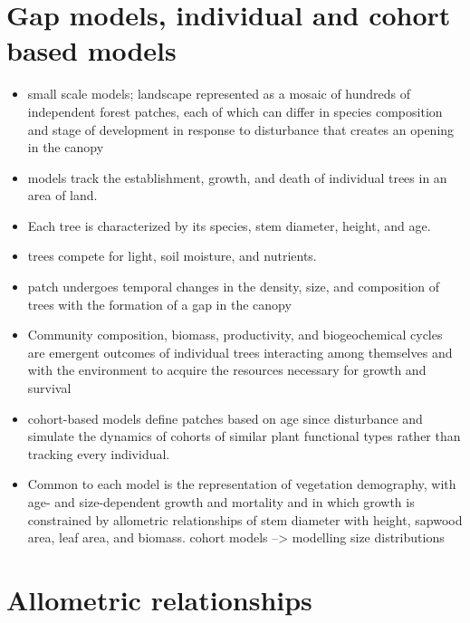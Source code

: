 \documentclass[oneside]{book}
\begin{document}
\section{Gap models, individual and cohort based
models}\label{gap-models-individual-and-cohort-based-models}

\begin{itemize}
\item
  small scale models; landscape represented as a mosaic of hundreds of
  independent forest patches, each of which can differ in species
  composition and stage of development in response to disturbance that
  creates an opening in the canopy
\item
  models track the establishment, growth, and death of individual trees
  in an area of land.
\item
  Each tree is characterized by its species, stem diameter, height, and
  age.
\item
  trees compete for light, soil moisture, and nutrients.
\item
  patch undergoes temporal changes in the density, size, and composition
  of trees with the formation of a gap in the canopy
\item
  Community composition, biomass, productivity, and biogeochemical
  cycles are emergent outcomes of individual trees interacting among
  themselves and with the environment to acquire the resources necessary
  for growth and survival
\item
  cohort-based models define patches based on age since disturbance and
  simulate the dynamics of cohorts of similar plant functional types
  rather than tracking every individual.
\item
  Common to each model is the representation of vegetation demography,
  with age- and size-dependent growth and mortality and in which growth
  is constrained by allometric relationships of stem diameter with
  height, sapwood area, leaf area, and biomass. cohort models
  --\textgreater{} modelling size distributions
\end{itemize}

\section{Allometric relationships}\label{allometric-relationships}
\end{document}
